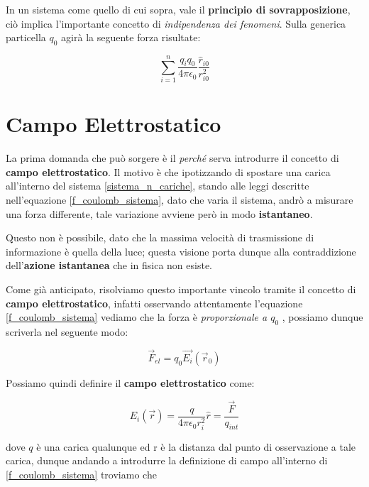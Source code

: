 In un sistema come quello di cui sopra, vale il \textbf{principio di sovrapposizione}, ciò implica l'importante concetto di \textit{indipendenza dei fenomeni}. Sulla generica particella $q_0$ agirà la seguente forza  risultate: 

\begin{equation}
	\sum_{i = 1}^{n}  \frac{q_i q_0}{4\pi\epsilon_0} \frac{\hat{r}_{i0}}{r_{i0}^2}
	\label{f_coulomb_sistema}
\end{equation}

\section{Campo Elettrostatico}
La prima domanda che può sorgere è il \textit{perché} serva introdurre il concetto di \textbf{campo elettrostatico}.  Il motivo è che ipotizzando di spostare una carica all'interno del sistema \ref{sistema_n_cariche}, stando alle leggi descritte nell'equazione \ref{f_coulomb_sistema}, dato che varia il sistema, andrò a misurare una forza differente, tale variazione avviene però in modo \textbf{istantaneo}. 

Questo non è possibile, dato che la massima velocità di trasmissione di informazione è quella della luce; questa visione porta dunque alla contraddizione dell'\textbf{azione istantanea} che in fisica non esiste.

Come già anticipato, risolviamo questo importante vincolo tramite il concetto di \textbf{campo elettrostatico}, infatti osservando attentamente l'equazione \ref{f_coulomb_sistema} vediamo che la forza è \textit{proporzionale a $q_0$} , possiamo dunque scriverla nel seguente modo:

\begin{large}
	\begin{equation}
		\vec{F}_{el} = q_0 \vec{E_i}(\vec{r}_0)
	\end{equation}
\end{large}


Possiamo quindi definire il \textbf{campo elettrostatico} come: 

\begin{large}
\begin{equation}
		E_i(\vec{r}) = \frac{q}{4\pi\epsilon_0 r_i^2} \hat{r} = \frac{\vec{F}}{q_{int}}
	\label{campo_elettrostatico}
\end{equation}
\end{large}

dove $q$ è una carica qualunque ed r è la distanza dal punto di osservazione a tale carica, dunque andando a introdurre la definizione di campo all'interno di \ref{f_coulomb_sistema} troviamo che

